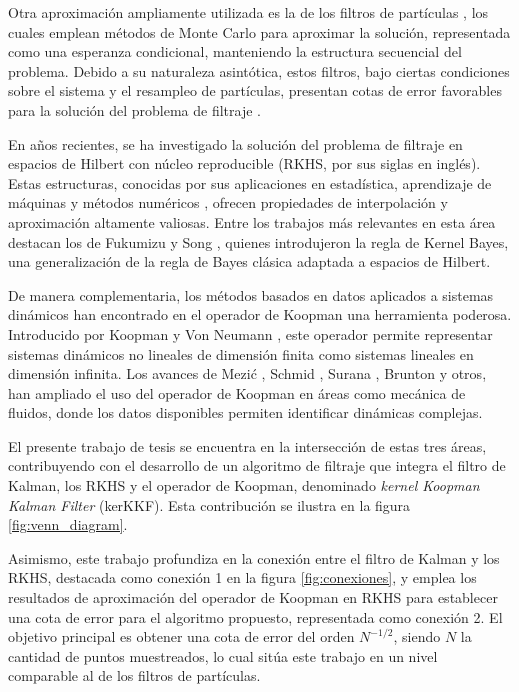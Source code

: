 Otra aproximación ampliamente utilizada es la de los filtros de partículas \cite{Liu1998SequentialSystems}, los cuales emplean métodos de Monte Carlo para aproximar la solución, representada como una esperanza condicional, manteniendo la estructura secuencial del problema. Debido a su naturaleza asintótica, estos filtros, bajo ciertas condiciones sobre el sistema y el resampleo de partículas, presentan cotas de error favorables para la solución del problema de filtraje \cite{Crisan2002APractitioners}.

En años recientes, se ha investigado la solución del problema de filtraje en espacios de Hilbert con núcleo reproducible (RKHS, por sus siglas en inglés). Estas estructuras, conocidas por sus aplicaciones en estadística, aprendizaje de máquinas y métodos numéricos \cite{Wendland2004ScatteredApproximation, Christmann2008SupportMachines}, ofrecen propiedades de interpolación y aproximación altamente valiosas. Entre los trabajos más relevantes en esta área destacan los de Fukumizu y Song \cite{Fukumizu2004DimensionalitySpaces, Song2009HilbertSystems}, quienes introdujeron la regla de Kernel Bayes, una generalización de la regla de Bayes clásica adaptada a espacios de Hilbert.

De manera complementaria, los métodos basados en datos aplicados a sistemas dinámicos han encontrado en el operador de Koopman una herramienta poderosa. Introducido por Koopman y Von Neumann \cite{Koopman1931HamiltonianSpace, Koopman1932DynamicalSpectra}, este operador permite representar sistemas dinámicos no lineales de dimensión finita como sistemas lineales en dimensión infinita. Los avances de Mezić \cite{Mezic2013AnalysisOperator}, Schmid \cite{Schmid2008DynamicData}, Surana \cite{Surana2016KoopmanSystems}, Brunton \cite{Brunton2016KoopmanControl} y otros, han ampliado el uso del operador de Koopman en áreas como mecánica de fluidos, donde los datos disponibles permiten identificar dinámicas complejas.

El presente trabajo de tesis se encuentra en la intersección de estas tres áreas, contribuyendo con el desarrollo de un algoritmo de filtraje que integra el filtro de Kalman, los RKHS y el operador de Koopman, denominado \textit{kernel Koopman Kalman Filter} (kerKKF). Esta contribución se ilustra en la figura \ref{fig:venn_diagram}.

Asimismo, este trabajo profundiza en la conexión entre el filtro de Kalman y los RKHS, destacada como conexión 1 en la figura \ref{fig:conexiones}, y emplea los resultados de aproximación del operador de Koopman en RKHS para establecer una cota de error para el algoritmo propuesto, representada como conexión 2. El objetivo principal es obtener una cota de error del orden $N^{-1/2}$, siendo $N$ la cantidad de puntos muestreados, lo cual sitúa este trabajo en un nivel comparable al de los filtros de partículas.

